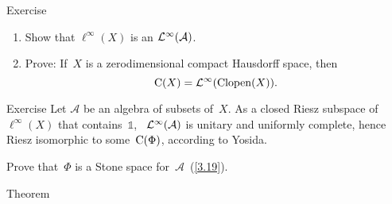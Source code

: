 \documentclass[main.tex]{subfiles}
\begin{document}
%
%
\begin{psec}{6.8}{Exercise}
\begin{enumerate}
\item\label{6.8-1}
Show that $\ell^\infty(X)$ is an $\mathcal{L}^\infty(\mathcal A)$.
%
\item\label{6.8-2}
Prove:
If~$X$ is a zerodimensional compact Hausdorff space,
then
\begin{equation*}
\mathrm{C}(X)=\mathcal{L}^\infty(\mathrm{Clopen}(X))\text{.}
\end{equation*}
\end{enumerate}
\end{psec}
%
%
\begin{psec}{6.9}{Exercise}
Let $\mathcal A$ be an algebra of subsets of~$X$.
As a closed Riesz subspace of~$\ell^\infty(X)$
that contains~$\mathbb 1$, \ 
$\mathcal{L}^\infty(\mathcal A)$ is unitary and uniformly complete,
hence Riesz isomorphic to some~$\mathrm{C}(\Phi)$,
according to Yosida.

Prove that~$\Phi$ is a Stone space for~$\mathcal A$~(\ref{3.19}).
\end{psec}
%
%
\begin{psec}{6.10}{Theorem}\end{psec}
\end{document}
